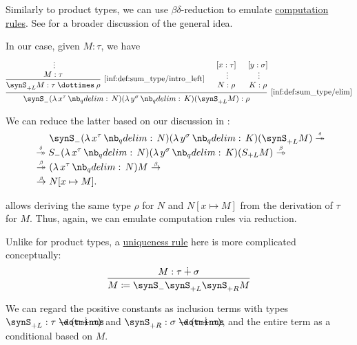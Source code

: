 \begin{remark}\label{rem:sum_type_equality_rules}
  Similarly to product types, we can use \( \beta\delta \)-reduction to emulate \hyperref[rem:type_theory_rule_classification/equality/computation]{computation rules}. See  for a broader discussion of the general idea.

  In our case, given \( M: \tau \), we have
  \begin{equation*}
    \begin{prooftree}
      \hypo{}
      \ellipsis {} { M: \tau }
      \infer1[\ref{inf:def:sum_type/intro_left}]{ \synS_{+L} M: \tau \syntimes \rho }

      \hypo{ [x: \tau] }
      \ellipsis {} { N: \rho }

      \hypo{ [y: \sigma] }
      \ellipsis {} { K: \rho }

      \infer3[\ref{inf:def:sum_type/elim}]{ \synS_- (\qabs {x^\tau} N) (\qabs {y^\sigma} K) (\synS_{+L} M): \rho }
    \end{prooftree}
  \end{equation*}

  We can reduce the latter based on our discussion in :
  \begin{align*}
    &\phantom{{}\bred*{}}
    \synS_- (\qabs {x^\tau} N) (\qabs {y^\sigma} K) (\synS_{+L} M)
    \dred* \\ &\dred*
    S_- (\qabs {x^\tau} N) (\qabs {y^\sigma} K) (S_{+L} M)
    \bred* \\ &\bred*
    (\qabs {x^\tau} N) M
    \bred \\ &\bred
    N[x \mapsto M].
  \end{align*}

   allows deriving the same type \( \rho \) for \( N \) and \( N[x \mapsto M] \) from the derivation of \( \tau \) for \( M \). Thus, again, we can emulate computation rules via reduction.

  Unlike for product types, a \hyperref[rem:type_theory_rule_classification/equality/uniqueness]{uniqueness rule} here is more complicated conceptually:
  \begin{equation*}
    \begin{prooftree}
      \hypo{ M: \tau \synplus \sigma }
      \infer1{ M \coloneqq \synS_- \synS_{+L} \synS_{+R} M }
    \end{prooftree}
  \end{equation*}

  We can regard the positive constants as inclusion terms with types \( \synS_{+L}: \tau \synimplies (\tau \synplus \sigma) \) and \( \synS_{+R}: \sigma \synimplies (\tau \synplus \sigma) \), and the entire term as a conditional based on \( M \).
\end{remark}

